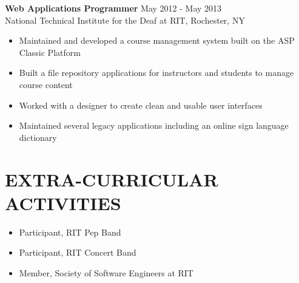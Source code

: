 \documentclass[line,margin]{res}
\begin{document}
\begin{resume}
			   {\bf Web Applications Programmer} \hfill May 2012 - May 2013\\
               National Technical Institute for the Deaf at RIT, 
               Rochester, NY
               
                 \begin{itemize}  \itemsep -2pt %
				  \item Maintained and developed a course management system built on the ASP Classic Platform
                  \item Built a file repository applications for instructors and students to manage course content
                  \item Worked with a designer to create clean and usable user interfaces
                  \item Maintained several legacy applications including an online sign language dictionary
                \end{itemize}
 

   
 
				 \section{EXTRA-CURRICULAR \\ ACTIVITIES}             
				     \begin{itemize}  \itemsep -2pt 
						\item Participant, RIT Pep Band
				     	\item Participant, RIT Concert Band 
					 	\item Member, Society of Software Engineers at RIT
				 	\end{itemize} 
\end{resume}
\end{document}
